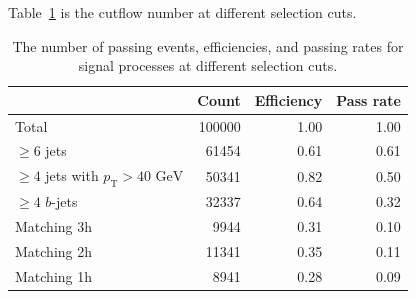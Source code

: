 \documentclass[12pt]{article}
\begin{document}
    Table~\ref{tab:preselection_cutflow_number} is the cutflow number at different selection cuts.
    \begin{table}[htpb]
        \centering
        \caption{The number of passing events, efficiencies, and passing rates for signal processes at different selection cuts.}
        \label{tab:preselection_cutflow_number}
        \begin{tabular}{l|rrr}
                                                         & Count  & Efficiency & Pass rate \\ \hline
        Total                                            & 100000 & 1.00       & 1.00      \\
        $\ge 6$ jets                                     & 61454  & 0.61       & 0.61      \\
        $\ge 4$ jets with $p_{\text{T}} > \text{40 GeV}$ & 50341  & 0.82       & 0.50      \\
        $\ge 4$ $b$-jets                                 & 32337  & 0.64       & 0.32      \\ \hline
        Matching 3h                                      & 9944   & 0.31       & 0.10      \\
        Matching 2h                                      & 11341  & 0.35       & 0.11      \\
        Matching 1h                                      & 8941   & 0.28       & 0.09      \\
        \end{tabular}
    \end{table}
\end{document}

